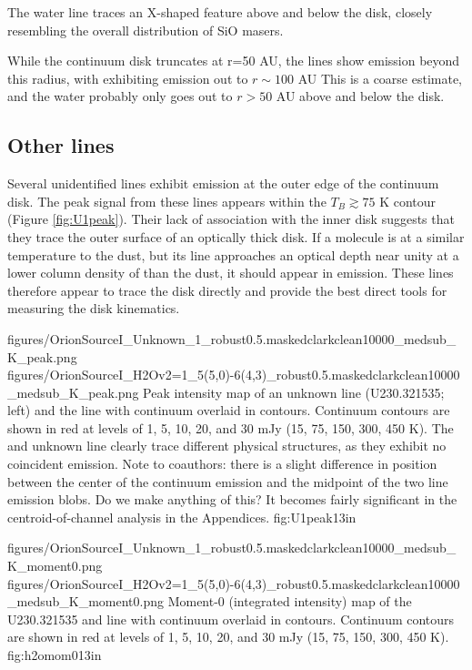 \documentclass[twocolumn]{aastex61}
\begin{document}
The water line traces an X-shaped feature above and below the disk, closely
resembling the overall distribution of SiO masers.

While the continuum disk truncates at r=50 AU, the lines show emission
beyond this radius, with \water exhibiting emission out to $r\sim100$ AU
{\color{red} This is a coarse estimate, and the water probably only goes out to
$r>50$ AU above and below the disk}.

\subsection{Other lines}
Several unidentified lines exhibit emission at the outer edge of the continuum disk.
The peak signal from these lines appears within the $T_B\gtrsim75$ K contour
(Figure \ref{fig:U1peak}).
Their lack of association with the inner disk suggests that they trace the outer
surface of an optically thick disk.
If a molecule is at a similar temperature to the dust, but its line approaches
an optical depth near unity at a lower column density of \hh than the dust,
it should appear in emission.  These lines therefore appear to trace the disk
directly and provide the best direct tools for measuring the disk kinematics.

\FigureTwo
{{figures/OrionSourceI_Unknown_1_robust0.5.maskedclarkclean10000_medsub_K_peak}.png}
{{figures/OrionSourceI_H2Ov2=1_5(5,0)-6(4,3)_robust0.5.maskedclarkclean10000_medsub_K_peak}.png}
{Peak intensity map of an unknown line (U230.321535; left) and the \water
line with continuum overlaid
in contours.  Continuum contours are shown in red at levels of 1, 5, 10, 20, and 30
mJy \perbeam (15, 75, 150, 300, 450 K).
The \water and unknown line clearly trace different physical structures, as
they exhibit no coincident emission.
{\color{red} Note to coauthors: there is a slight difference in position between the
center of the continuum emission and the midpoint of the two line emission blobs.
Do we make anything of this?  It becomes fairly significant in the centroid-of-channel
analysis in the Appendices.}
}
{fig:U1peak}{1}{3in}

\FigureTwo
{{figures/OrionSourceI_Unknown_1_robust0.5.maskedclarkclean10000_medsub_K_moment0}.png}
{{figures/OrionSourceI_H2Ov2=1_5(5,0)-6(4,3)_robust0.5.maskedclarkclean10000_medsub_K_moment0}.png}
{Moment-0 (integrated intensity) map of the U230.321535 and \water line with continuum overlaid
in contours.  Continuum contours are shown in red at levels of 1, 5, 10, 20, and 30
mJy \perbeam (15, 75, 150, 300, 450 K).
}
{fig:h2omom0}{1}{3in}
\end{document}
